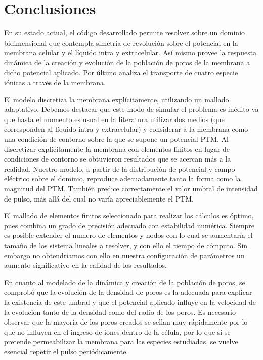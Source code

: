 \chapter{Conclusiones}

En su estado actual, el código desarrollado permite resolver sobre un dominio bidimensional que contempla simetría de revolución sobre el potencial en la membrana celular y el líquido intra y extracelular. Así mismo provee la respuesta dinámica de la creación y evolución de la población de poros de la membrana a dicho potencial aplicado. Por último analiza el transporte de cuatro especie iónicas a través de la membrana.

El modelo discretiza la membrana explícitamente, utilizando un mallado adaptativo. Debemos destacar que este modo de simular el problema es inédito ya que hasta el momento es usual en la literatura utilizar dos medios (que corresponden al líquido intra y extracelular) y considerar a la membrana como una condición de contorno sobre la que se supone un potencial PTM. Al discretizar explícitamente la membrana con elementos finitos en lugar de condiciones de contorno se obtuvieron resultados que se acercan más a la realidad. Nuestro modelo, a partir de la distribución de potencial y campo eléctrico sobre el dominio, reproduce adecuadamente tanto la forma como la magnitud del PTM. También predice correctamente el valor umbral de intensidad de pulso, más allá del cual no varía apreciablemente el PTM.

El mallado de elementos finitos seleccionado para realizar los cálculos es óptimo, pues combina un grado de precisión adecuado con estabilidad numérica. Siempre es posible extender el numero de elementos y nodos con lo cual se aumentaría el tamaño de los sistema lineales a resolver, y con ello el tiempo de cómputo. Sin embargo no obtendríamos con ello en nuestra configuración de parámetros un aumento significativo en la calidad de los resultados.

En cuanto al modelado de la dinámica y creación de la población de poros, se comprobó que la evolución de la densidad de poros es la adecuada para explicar la existencia de este umbral y que el potencial aplicado influye en la velocidad de la evolución tanto de la densidad como del radio de los poros. 
Es necesario observar que la mayoría de los poros creados se sellan muy rápidamente por lo que no influyen en el ingreso de iones dentro de la célula, por lo que si se pretende permeabilizar la membrana para las especies estudiadas, se vuelve esencial repetir el pulso periódicamente. 


